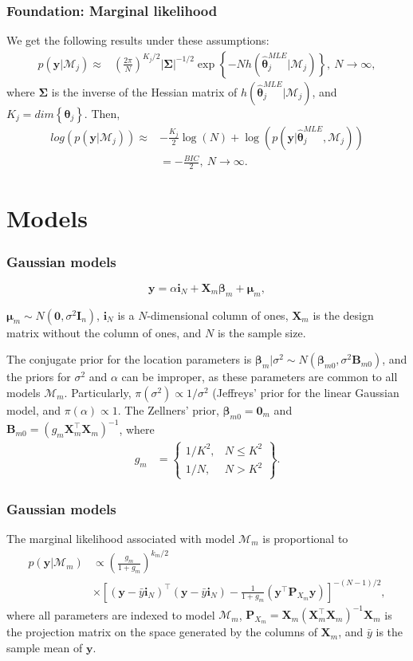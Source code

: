 \documentclass[12pt, compress]{beamer}
\begin{document}
\begin{frame}
	\frametitle{Foundation: Marginal likelihood}
We get the following results under these assumptions:
\begin{align*}
	p(\bm{y} | \mathcal{M}_j)\approx&\left( \frac{2\pi}{N}\right)^{K_j/2}|\bm{\Sigma}|^{-1/2} \exp\left\{-N h(\bm{\hat{\theta}}_j^{MLE}|\mathcal{M}_j)\right\}, \ N\rightarrow\infty,
\end{align*}
where $\bm{\Sigma}$ is the inverse of the Hessian matrix of $h(\bm{\hat{\theta}}_j^{MLE}|\mathcal{M}_j)$, and $K_j=dim\left\{\bm{\theta}_j\right\}$.
Then,
\begin{align*}
	log\left(p(\bm{y} | \mathcal{M}_j)\right)\approx& -\frac{K_j}{2}\log(N)+\log(p(\bm{y}| \bm{\hat{\theta}}_j^{MLE},\mathcal{M}_j))\\
    &= -\frac{BIC}{2}, \ N \rightarrow \infty.
\end{align*}

\end{frame}
\section{Models}
\begin{frame}
	\frametitle{Gaussian models}
$$\bm{y}=\alpha\bm{i}_N+\bm{X}_m\bm{\beta}_m+\bm{\mu}_m,$$

$\bm{\mu}_m\sim{N}(\bm{0},\sigma^2\bm{I}_n)$, $\bm{i}_N$ is a $N$-dimensional column of ones, $\bm{X}_m$ is the design matrix without the column of ones, and $N$ is the sample size. 

The conjugate prior for the location parameters is $\bm{\beta}_m|\sigma^2 \sim {N}(\bm{\beta}_{m0}, \sigma^2 \bm{B}_{m0})$, and the priors for $\sigma^2$ and $\alpha$ can be improper, as these parameters are common to all models $\mathcal{M}_m$. Particularly, $\pi(\sigma^2)\propto 1/\sigma^2$ (Jeffreys' prior for the linear Gaussian model, and $\pi(\alpha)\propto 1$. The Zellners' prior, $\bm{\beta}_{m0}=\bm{0}_m$ and $\bm{B}_{m0}=(g_m\bm{X}_m^{\top}\bm{X}_m)^{-1}$, where
\begin{align*}
	g_m & =
	\begin{Bmatrix}
		1/K^2, & N \leq K^2\\
		1/N, & N>K^2 
	\end{Bmatrix}.
\end{align*}

\end{frame}

\begin{frame}
	\frametitle{Gaussian models}
The marginal likelihood associated with model $\mathcal{M}_m$ is proportional to
\begin{align*}
	p(\bm{y}|\mathcal{M}_m)&\propto \left(\frac{g_m}{1+g_m}\right)^{k_m/2}\\
    &\times\left[(\bm{y}-\bar{y}\bm{i}_N)^{\top}(\bm{y}-\bar{y}\bm{i}_N)-\frac{1}{1+g_m}(\bm{y}^{\top}\bm{P}_{X_m}\bm{y})\right]^{-(N-1)/2},
\end{align*}
where all parameters are indexed to model $\mathcal{M}_m$, $\bm{P}_{X_m}=\bm{X}_m(\bm{X}_m^{\top}\bm{X}_m)^{-1}\bm{X}_m$ is the projection matrix on the space generated by the columns of $\bm{X}_m$, and $\bar{y}$ is the sample mean of $\bm{y}$.
\end{frame}
\end{document}
